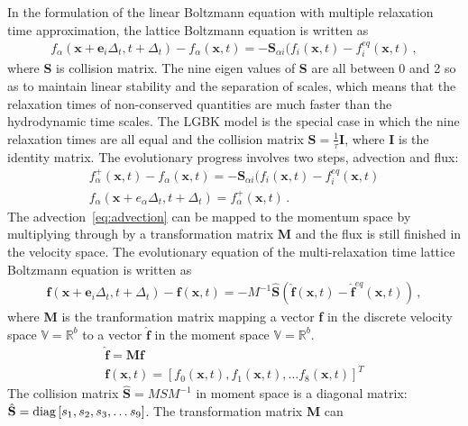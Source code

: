 In the formulation of the linear Boltzmann equation with multiple relaxation 
time approximation, the lattice Boltzmann equation is written as
%
\begin{align}
f_{\alpha}(\mathbf{x}+\mathbf{e}_i\Delta_t, t+ 
\Delta_t)-f_{\alpha}(\mathbf{x},t)=-\mathbf{S}_{\alpha 
i}(f_i(\mathbf{x},t)-f_i^{eq}(\mathbf{x},t)\,,
\end{align}
%
\noindent where \textbf{S} is collision matrix. The nine eigen values of 
\textbf{S} are all between 0 and 2 so as to maintain linear stability and the 
separation of scales, which means that the relaxation times of non-conserved 
quantities are much faster than the hydrodynamic time scales. The LGBK model is 
the special case in which the nine relaxation times are all equal and the 
collision matrix $\mathbf{S}=\frac{1}{\tau}\mathbf{I}$, where \textbf{I} is the 
identity matrix. The evolutionary progress involves two steps, advection and 
flux:
%
\begin{gather}
f_{\alpha}^+(\mathbf{x},t)-f_{\alpha}(\mathbf{x},t) = -\mathbf{S}_{\alpha i}(f_i(\mathbf{x},t)-f_i^{eq}(\mathbf{x},t) \label{eq:advection}\\
f_{\alpha}(\mathbf{x}+e_{\alpha}\Delta_t, t+\Delta_t) = 
f_{\alpha}^+(\mathbf{x},t)\,.
\end{gather}
%
\noindent The advection~\cref{eq:advection} can be mapped to the momentum 
space by multiplying through by a transformation matrix \textbf{M} and the flux 
is still finished in the velocity space. The evolutionary equation of the 
multi-relaxation time lattice Boltzmann equation is written as
%
\begin{gather}
\mathbf{f}(\mathbf{x}+\mathbf{e}_i\Delta_t, t+ 
\Delta_t)-\mathbf{f}(\mathbf{x},t)=-M^{-1}\hat{\mathbf{S}}(\hat{\mathbf{f}}
(\mathbf{x},t)-\hat{\mathbf{f}}^{eq}(\mathbf{x},t))\,,
\end{gather}
%
\noindent where \textbf{M} is the tranformation matrix mapping a vector 
\textbf{f} in the discrete velocity space $\mathds{V}=\mathds{R}^b$ to a vector 
$\hat{\mathbf{f}}$ in the moment space $\mathds{V}=\mathds{R}^b$. 
%
\begin{gather}
\nonumber
\hat{\mathbf{f}}= \mathbf{M}\mathbf{f} \\ 
\nonumber
\mathbf{f}(\mathbf{x},t) =\left[f_0(\mathbf{x},t),f_1(\mathbf{x},t),\dots f_8(\mathbf{x},t)\right]^T
\end{gather}
%
The collision matrix $\hat{\mathbf{S}} = MSM^{-1}$ in moment space is a 
diagonal matrix: $\hat{\mathbf{S}} =\mbox{diag} \left[ s_1, s_2, 
s_3,\linebreak[0] \dots s_9  \right]$. The transformation matrix \textbf{M} can 
